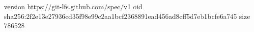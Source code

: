 version https://git-lfs.github.com/spec/v1
oid sha256:2f2e13e27936cd35f98e99c2aa1bcf2368891ead456ad8cff5d7eb1bcfe6a745
size 786528
